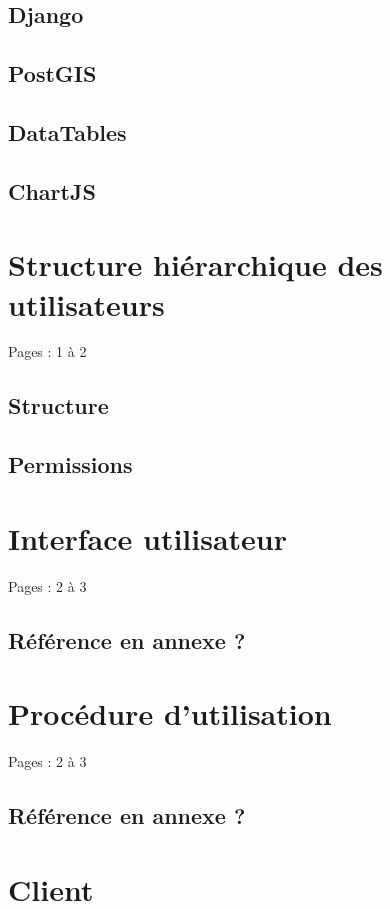 \documentclass{eplmastersthesis_FR}
\begin{document}
			\subsection*{Django}
			\subsection*{PostGIS}
			\subsection*{DataTables}
			\subsection*{ChartJS}

		\section{Structure hiérarchique des utilisateurs}

			Pages : 1 à 2

			\subsection*{Structure}
			\subsection*{Permissions}

		\section{Interface utilisateur}

			Pages : 2 à 3

			\subsection*{Référence en annexe ?}

		\section{Procédure d'utilisation}

			Pages : 2 à 3

			\subsection*{Référence en annexe ?}

		\section{Client}
\end{document}
